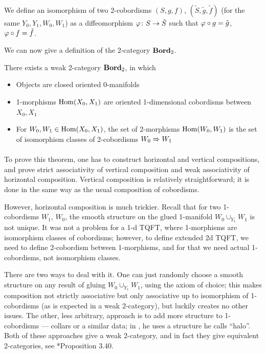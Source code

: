 We define an isomorphism of two 2-cobordisms $(S, g,f)$, $(\tilde S, \tilde
g, \tilde f)$ (for the same $Y_0,Y_1, W_0, W_1$) as a diffeomorphism $\varphi\colon
S\to \tilde S$ such that $\varphi\circ g = \tilde g$, $\varphi\circ f=\tilde f$.

We can now give a definition of the 2-category $\mathbf{Bord}_2$.

\begin{theorem}\label{t:bord2}
  There exists a weak 2-category $\mathbf{Bord}_2$, in which
  \begin{itemize}
    \item Objects are closed oriented $0$-manifolds
    \item 1-morphisms $\operatorname{Hom}(X_0, X_1)$ are oriented 1-dimensional cobordisms
      between $X_0, X_1$
    \item For $W_0, W_1\in \operatorname{Hom}(X_0, X_1)$, the set of 2-morphisms
       $\operatorname{Hom}(W_0,W_1)$ is the set of isomorphism classes of 2-cobordisms
       $W_0\xRightarrow{}W_1$
  \end{itemize}
\end{theorem}
To prove this theorem, one has to construct horizontal and vertical
compositions, and prove strict associativity of vertical composition and
weak associativity of horizontal composition. Vertical composition is
relatively straightforward; it is done in the same way as the usual
composition of cobordisms.

However, horizontal composition is much trickier. Recall that for two
1-cobordisms $W_1$, $W_0$, the smooth structure on the glued 1-manifold
$W_0\cup_{Y_1} W_1$ is not unique. It was not a problem for a 1-d TQFT, where
1-morphisms are isomorphism classes of cobordisms; however, to define extended
2d TQFT, we need to define 2-cobordism between 1-morphisms, and for that we
need actual 1-cobordisms, not isomorphism classes.

There are two ways to deal with it. One can just randomly choose a smooth
structure on any result of gluing $W_0\cup_{Y_1} W_1$, using the axiom of choice;
this makes composition not strictly associative but only associative up to
isomorphism of 1-cobordisms (as is expected in a weak 2-category), but luckily
creates no other issues. The other, less arbitrary, approach is to add more
structure to 1-cobordisms --- collars or a similar data; in
, he uses a structure he calls ``halo''. Both of these
approaches give a weak 2-category, and in fact they give equivalent
2-categories, see *{Proposition 3.40}.

